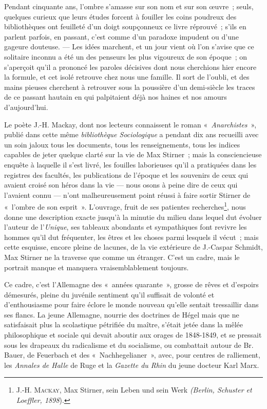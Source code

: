 \documentclass[french,twoside]{book} %
\begin{document}
Pendant cinquante ans, l’ombre s’amasse sur son nom et sur son œuvre ; seuls, quelques curieux que leurs études forcent à fouiller les coins poudreux des bibliothèques ont feuilleté d’un doigt soupçonneux ce livre réprouvé ; s’ils en parlent parfois, en passant, c’est comme d’un paradoxe impudent ou d’une gageure douteuse. — Les idées marchent, et un jour vient où l’on s’avise que ce solitaire inconnu a été un des penseurs les plus vigoureux de son époque ; on s’aperçoit qu’il a prononcé les paroles décisives dont nous cherchions hier encore la formule, et cet isolé retrouve chez nous une famille. Il sort de l’oubli, et des mains pieuses cherchent à retrouver sous la poussière d’un demi-siècle les traces de ce passant hautain en qui palpitaient déjà nos haines et nos amours d’aujourd’hui.\par
Le poète J.-H. Mackay, dont nos lecteurs connaissent le roman « \emph{Anarchistes} », publié dans cette même \emph{bibliothèque Sociologique} a pendant dix ans recueilli avec un soin jaloux tous les documents, tous les renseignements, tous les indices capables de jeter quelque clarté sur la vie de Max Stirner ; mais la consciencieuse enquête à laquelle il s’est livré, les fouilles laborieuses qu’il a pratiquées dans les registres des facultés, les publications de l’époque et les souvenirs de ceux qui avaient croisé son héros dans la vie — nous osons à peine dire de ceux qui l’avaient connu — n’ont malheureusement point réussi à faire sortir Stirner de « l’ombre de son esprit ». L’ouvrage, fruit de ses patientes recherches\footnote{ \noindent J.-H. M{\scshape ackay}, Max Stirner, sein Leben und sein Werk \emph{(Berlin, Schuster et Loeffler, 1898}).
 }, nous donne une description exacte jusqu’à la minutie du milieu dans lequel dut évoluer l’auteur de l’\emph{Unique}, ses tableaux abondants et sympathiques font revivre les hommes qu’il dut fréquenter, les êtres et les choses parmi lesquels il vécut ; mais cette esquisse, encore pleine de lacunes,  de la vie extérieure de J.-Caspar Schmidt, Max Stirner ne la traverse que comme un étranger. C’est un cadre, mais le portrait manque et manquera vraisemblablement toujours.\par
Ce cadre, c’est l’Allemagne des « années quarante », grosse de rêves et d’espoirs démesurés, pleine du juvénile sentiment qu’il suffisait de volonté et d’enthousiasme pour faire éclore le monde nouveau qu’elle sentait tressaillir dans ses flancs. La jeune Allemagne, nourrie des doctrines de Hégel mais que ne satisfaisait plus la scolastique pétrifiée du maître, s’était jetée dans la mêlée philosophique et sociale qui devait aboutir aux orages de 1848-1849, et se pressait sous les drapeaux du radicalisme et du socialisme, ou combattait autour de Br. Bauer, de Feuerbach et des « Nachhegelianer », avec, pour centres de ralliement, les \emph{Annales de Halle} de Ruge et la \emph{Gazette du Rhin} du jeune docteur Karl Marx.\par
\end{document}
